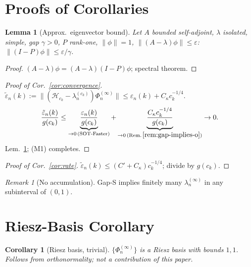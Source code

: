 \documentclass[12pt,a4paper]{amsart}
\newtheorem{lemma}[theorem]{Lemma}
\newtheorem{corollary}[theorem]{Corollary}
\theoremstyle{definition}
\theoremstyle{remark}
\newtheorem{remark}[theorem]{Remark}
\begin{document}
\section{Proofs of Corollaries}
\label{sec:proj}

\begin{lemma}[Approx.\ eigenvector
  bound]
\label{lem:approx-eig}
Let $A$ bounded self-adjoint,
$\lambda$ isolated, simple, gap
$\gamma>0$, $P$ rank-one,
$\|\phi\|=1$,
$\|(A-\lambda)\phi\|\le\varepsilon$:
$\|(I-P)\phi\|\le\varepsilon/\gamma$.
\end{lemma}
\begin{proof}
$(A-\lambda)\phi=(A-\lambda)(I-P)\phi$;
spectral theorem.
\end{proof}

\begin{proof}[Proof of
  Cor.~\ref{cor:convergence}]
$\tilde\varepsilon_n(k)
:=\|(\mathcal{H}_{c_k}
-\lambda_n^{(c_k)})
\Phi_n^{(\infty)}\|
\le\varepsilon_n(k)+C_\kappa c_k^{-1/4}$.
\begin{equation}\label{eq:ratio-to-zero}
  \frac{\tilde\varepsilon_n(k)}
  {g(c_k)}
  \le
  \underbrace{\frac{\varepsilon_n(k)}
    {g(c_k)}}_{\to 0
    \,(\text{SOT-Faster})}
  +\underbrace{\frac{C_\kappa c_k^{-1/4}}
    {g(c_k)}}_{\to 0
    \,(\text{Rem.}\,
    \ref{rem:gap-implies-o})}
  \to 0.
\end{equation}
Lem.~\ref{lem:approx-eig};
(M1) completes.
\end{proof}

\begin{proof}[Proof of
  Cor.~\ref{cor:rate}]
$\tilde\varepsilon_n(k)
\le(C'+C_\kappa)c_k^{-1/4}$;
divide by $g(c_k)$.
\end{proof}

\begin{remark}[No accumulation]
\label{rem:nacc}
Gap-S implies finitely many
$\lambda_n^{(\infty)}$
in any subinterval of $(0,1)$.
\end{remark}

\section{Riesz-Basis Corollary}
\label{sec:riesz-trivial}
\begin{corollary}[Riesz basis, trivial]
\label{cor:riesz}
$\{\Phi_n^{(\infty)}\}$ is a Riesz
basis with bounds $1,1$.
Follows from orthonormality;
not a contribution of this paper.
\end{corollary}
\end{document}
